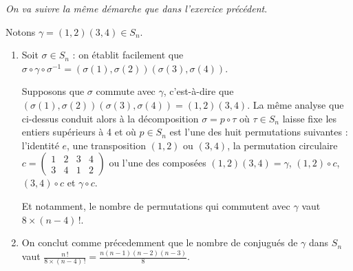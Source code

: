 \emph{On va suivre la même démarche que dans l'exercice précédent}.

Notons $\gamma = (1,2)(3,4) \in S_n$.
\begin{enumerate}
  \item Soit $\sigma \in S_n$ : on établit facilement que $\sigma \circ \gamma \circ \sigma^{-1} =\left(\sigma(1),\sigma(2)\right)\left(\sigma(3),\sigma(4)\right)$.


  Supposons que $\sigma$ commute avec $\gamma$, c'est-à-dire que $\left(\sigma(1),\sigma(2)\right)\left(\sigma(3),\sigma(4)\right) = (1,2)(3,4)$. La même analyse que ci-dessus conduit alors à la décomposition $\sigma = p \circ \tau$ où $\tau \in S_n$ laisse fixe les entiers supérieurs à 4 et où $p\in S_n$ est l'une des huit permutations suivantes : l'identité $e$, une transposition $(1,2)$ ou $(3,4)$, la permutation circulaire $c=\begin{pmatrix}1&2&3&4\\3&4&1&2                                                                                                                                                                                                                                                        \end{pmatrix}$ ou l'une des composées $(1,2)(3,4)=\gamma$, $(1,2)\circ c$, $(3,4)\circ c$ et $\gamma\circ c$.

  Et notamment, le nombre de permutations qui commutent avec $\gamma$ vaut $8\times (n-4)\,!$.

  \item On conclut comme précedemment que le nombre de conjugués de $\gamma$ dans $S_n$ vaut  $\frac{n\,!}{8\times (n-4)\,!} = \frac{n(n-1)(n-2)(n-3)}{8}$.

\end{enumerate}
